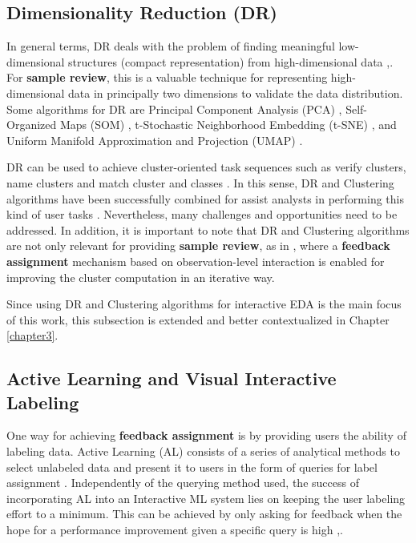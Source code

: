 \subsection{Dimensionality Reduction (DR)}
\label{subsection2.1.1}

In general terms, DR deals with the problem of finding meaningful low-dimensional structures (compact representation) from high-dimensional data \cite{Tenenbaum2000},\cite{Roweis2000}. For \textbf{sample review}, this is a valuable technique for representing high-dimensional data in principally two dimensions to validate the data distribution. Some algorithms for DR are Principal Component Analysis (PCA) \cite{PCA}, Self-Organized Maps (SOM) \cite{Kohonen1982Self-organizedMaps}, t-Stochastic Neighborhood Embedding (t-SNE) \cite{VanDerMaaten2008}, and Uniform Manifold Approximation and Projection (UMAP) \cite{McInnes2018}.

DR can be used to achieve cluster-oriented task sequences such as verify clusters, name clusters and match cluster and classes \cite{Brehmer2014VisualizingSequences}. In this sense, DR and Clustering algorithms have been successfully combined for assist analysts in performing this kind of user tasks \cite{Wenskovitch2018}. Nevertheless, many challenges and opportunities need to be addressed. In addition, it is important to note that DR and Clustering algorithms are not only relevant for providing \textbf{sample review}, as in \cite{Wenskovitch2017}, where a \textbf{feedback assignment} mechanism based on observation-level interaction is enabled for improving the cluster computation in an iterative way. 

Since using DR and Clustering algorithms for interactive EDA is the main focus of this work, this subsection is extended and better contextualized in Chapter \ref{chapter3}. 

\subsection{Active Learning and Visual Interactive Labeling}
\label{subsection2.1.2}

One way for achieving \textbf{feedback assignment} is by providing users the ability of labeling data. Active Learning (AL) consists of a series of analytical methods to select unlabeled data and present it to users in the form of queries for label assignment \cite{Holzinger2016}. Independently of the querying method used, the success of incorporating AL into an Interactive ML system lies on keeping the user labeling effort to a minimum. This can be achieved by only asking for feedback when the hope for a performance improvement given a specific query is high \cite{Olsson2009},\cite{Tong2001}.


